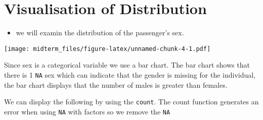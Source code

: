 \documentclass[]{article}
\newenvironment{Shaded}{\begin{snugshade}}{\end{snugshade}}
\newcommand{\CommentTok}[1]{\textcolor[rgb]{0.56,0.35,0.01}{\textit{#1}}}
\newcommand{\DataTypeTok}[1]{\textcolor[rgb]{0.13,0.29,0.53}{#1}}
\newcommand{\FloatTok}[1]{\textcolor[rgb]{0.00,0.00,0.81}{#1}}
\newcommand{\KeywordTok}[1]{\textcolor[rgb]{0.13,0.29,0.53}{\textbf{#1}}}
\newcommand{\NormalTok}[1]{#1}
\newcommand{\OperatorTok}[1]{\textcolor[rgb]{0.81,0.36,0.00}{\textbf{#1}}}
\newcommand{\StringTok}[1]{\textcolor[rgb]{0.31,0.60,0.02}{#1}}
\providecommand{\tightlist}{%
  \setlength{\itemsep}{0pt}\setlength{\parskip}{0pt}}
\begin{document}
\hypertarget{visualisation-of-distribution}{%
\section{Visualisation of
Distribution}\label{visualisation-of-distribution}}

\begin{itemize}
\tightlist
\item
  we will examin the distribution of the passenger's sex.
\end{itemize}

\begin{Shaded}
\end{Shaded}

\texttt{[image: midterm\_files/figure-latex/unnamed-chunk-4-1.pdf]}

Since sex is a categorical variable we use a bar chart. The bar chart
shows that there is 1 \texttt{NA} sex which can indicate that the gender
is missing for the individual, the bar chart displays that the number of
males is greater than females.

We can display the following by using the \texttt{count}. The count
function generates an error when using \texttt{NA} with factors so we
remove the \texttt{NA}

\begin{Shaded}
\end{Shaded}
\end{document}
